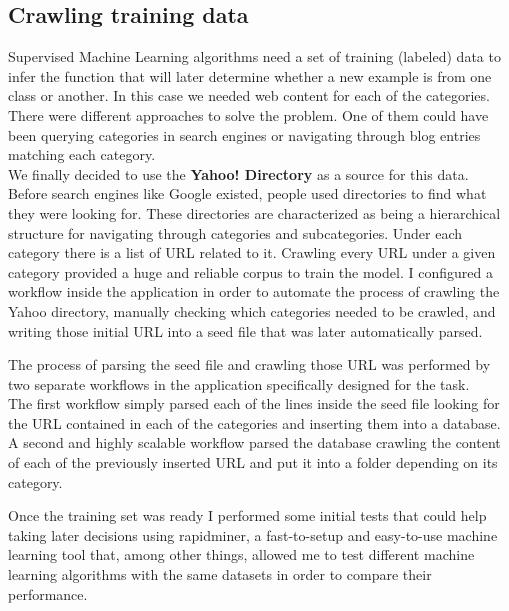 \subsection{Crawling training data}
Supervised Machine Learning algorithms need a set of training (labeled) data to infer the function that will later determine whether a new example is from one class or another. In this case we needed
web content for each of the categories. There were different approaches to solve the problem. One of them could have been querying categories in search engines or navigating through blog entries matching
each category. \\
We finally decided to use the {\bf Yahoo! Directory}\cite{yahoo} as a source for this data.
Before search engines like Google existed, people used directories to find what they were looking for. These directories are characterized as being a hierarchical structure for navigating through categories
and subcategories. Under each category there is a list of URL related to it.  
Crawling every URL under a given category provided a huge and reliable corpus to train the model.
I configured a workflow inside the application in order to automate the process of crawling the Yahoo directory, manually checking which categories needed to be crawled, and writing those initial URL into 
a seed file that was later automatically parsed.


The process of parsing the seed file and crawling those URL was performed by two separate  workflows in the application specifically designed for the task. \\
The first workflow simply parsed each of the lines inside the seed file looking for the URL contained in each of the categories and inserting them into a database. \\
A second and highly scalable workflow parsed the database crawling the content of each of the previously inserted URL and put it into a folder depending on its category. \\


\clearpage
{}

\clearpage
{}

Once the training set was ready I performed some initial tests that could help taking later decisions using rapidminer\cite{rapidminer}, a fast-to-setup and easy-to-use machine learning tool that, 
among other things, allowed me to test different machine learning algorithms with the same datasets in order to compare their performance. 

